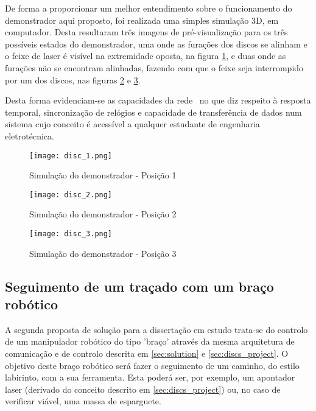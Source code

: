 De forma a proporcionar um melhor entendimento sobre o funcionamento do
demonstrador aqui proposto, foi realizada uma simples simulação 3D, em
computador. Desta resultaram três imagens de pré-visualização para os
três possíveis estados do demonstrador, uma onde as furações dos discos
se alinham e o feixe de laser é visível na extremidade oposta, na figura
\ref{fig:discs1}, e duas onde as furações não se encontram alinhadas,
fazendo com que o feixe seja interrompido por um dos discos, nas figuras
\ref{fig:discs2} e \ref{fig:discs3}.

Desta forma evidenciam-se as capacidades da rede \ecat\ no que diz
respeito à resposta temporal, sincronização de relógios e capacidade de
transferência de dados num sistema cujo conceito é acessível a qualquer
estudante de engenharia eletrotécnica.

\begin{figure}[htp]
 \centering
 \texttt{[image: disc\_1.png]}
 \caption{Simulação do demonstrador - Posição 1}
 \label{fig:discs1}
\end{figure}

\begin{figure}[htp]
 \centering
 \texttt{[image: disc\_2.png]}
 \caption{Simulação do demonstrador - Posição 2}
 \label{fig:discs2}
\end{figure}

\begin{figure}[htp]
 \centering
 \texttt{[image: disc\_3.png]}
 \caption{Simulação do demonstrador - Posição 3}
 \label{fig:discs3}
\end{figure}


\subsection{Seguimento de um traçado com um braço robótico}\label{sec:robotic_arm}

A segunda proposta de solução para a dissertação em estudo trata-se do
controlo de um manipulador robótico do tipo 'braço' através da mesma
arquitetura de comunicação e de controlo descrita em \ref{sec:solution} e
\ref{sec:discs_project}. O objetivo deste braço robótico será fazer o
seguimento de um caminho, do estilo labirinto, com a sua ferramenta.
Esta poderá ser, por exemplo, um apontador laser (derivado do conceito
descrito em \ref{sec:discs_project}) ou, no caso de verificar viável, uma
massa de esparguete.

